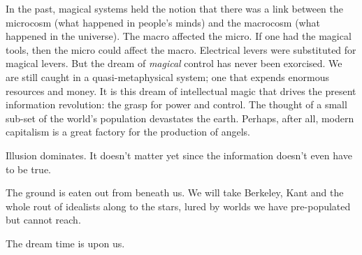 \documentclass[11pt,twoside,draft]{memoir}
\begin{document}
In the past, magical systems held the notion that there was a link between the microcosm (what happened in people's minds)
and the macrocosm (what happened in the
universe). The macro affected the micro. If
one had the magical tools, then the micro
could affect the macro. Electrical levers were
substituted for magical levers. But the dream
of \emph{magical} control has never been exorcised.
We are still caught in a quasi-metaphysical
system; one that expends enormous resources
and money. It is this dream of intellectual
magic that drives the present information
revolution: the grasp for power and control.
The thought of a small sub-set of the world's
population devastates the earth. Perhaps,
after all, modern capitalism is a great factory
for the production of angels.

Illusion dominates. It doesn't matter yet
since the information doesn't even have to
be true.

The ground is eaten out from beneath us.
We will take Berkeley, Kant and the whole
rout of idealists along to the stars, lured by
worlds we have pre-populated but cannot
reach.

The dream time is upon us.






\end{document}
